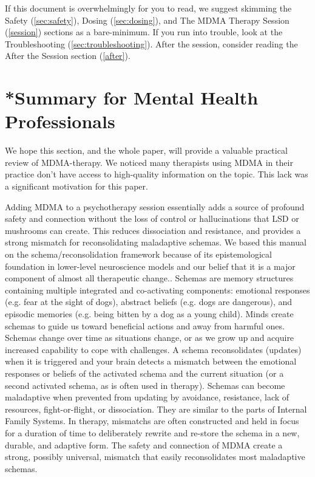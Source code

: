 \documentclass[12pt,letterpaper]{article}
\begin{document}
If this document is overwhelmingly for you to read, we suggest skimming the Safety (\ref{sec:safety}), Dosing (\ref{sec:dosing}), and The MDMA Therapy Session (\ref{session}) sections as a bare-minimum. If you run into trouble, look at the Troubleshooting (\ref{sec:troubleshooting}). After the session, consider reading the After the Session section (\ref{after}).
\section{*Summary for Mental Health Professionals}
We hope this section, and the whole paper, will provide a valuable practical review of MDMA-therapy. We noticed many therapists using MDMA in their practice don't have access to high-quality information on the topic. This lack was a significant motivation for this paper.

Adding MDMA to a psychotherapy session essentially adds a source of profound safety and connection without the loss of control or hallucinations that LSD or mushrooms can create. This reduces dissociation and resistance, and provides a strong mismatch for reconsolidating maladaptive schemas. We based this manual on the schema/reconsolidation framework because of its epistemological foundation in lower-level neuroscience models and our belief that it is a major component of almost all therapeutic change.. Schemas are memory structures containing multiple integrated and co-activating components: emotional responses (e.g. fear at the sight of dogs), abstract beliefs (e.g. dogs are dangerous), and episodic memories (e.g. being bitten by a dog as a young child). Minds create schemas to guide us toward beneficial actions and away from harmful ones. Schemas change over time as situations change, or as we grow up and acquire increased capability to cope with challenges. A schema reconsolidates (updates) when it is triggered and your brain detects a mismatch between the emotional responses or beliefs of the activated schema and the current situation (or a second activated schema, as is often used in therapy). Schemas can become maladaptive when prevented from updating by avoidance, resistance, lack of resources, fight-or-flight, or dissociation. They are similar to the parts of Internal Family Systems. In therapy, mismatchs are often constructed and held in focus for a duration of time to deliberately rewrite and re-store the schema in a new, durable, and adaptive form. The safety and connection of MDMA create a strong, possibly universal, mismatch that easily reconsolidates most maladaptive schemas.
\end{document}
